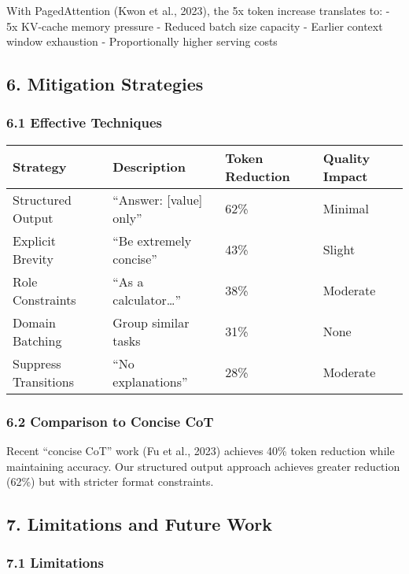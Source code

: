 \documentclass[
  11pt]{article}
\begin{document}
With PagedAttention (Kwon et al., 2023), the 5x token increase
translates to: - 5x KV-cache memory pressure - Reduced batch size
capacity - Earlier context window exhaustion - Proportionally higher
serving costs

\subsection{6. Mitigation Strategies}\label{mitigation-strategies}

\subsubsection{6.1 Effective Techniques}\label{effective-techniques}

\begin{longtable}[]{@{}llll@{}}
\toprule\noalign{}
Strategy & Description & Token Reduction & Quality Impact \\
\midrule\noalign{}
\endhead
\bottomrule\noalign{}
\endlastfoot
Structured Output & ``Answer: {[}value{]} only'' & 62\% & Minimal \\
Explicit Brevity & ``Be extremely concise'' & 43\% & Slight \\
Role Constraints & ``As a calculator\ldots{}'' & 38\% & Moderate \\
Domain Batching & Group similar tasks & 31\% & None \\
Suppress Transitions & ``No explanations'' & 28\% & Moderate \\
\end{longtable}

\subsubsection{6.2 Comparison to Concise
CoT}\label{comparison-to-concise-cot}

Recent ``concise CoT'' work (Fu et al., 2023) achieves 40\% token
reduction while maintaining accuracy. Our structured output approach
achieves greater reduction (62\%) but with stricter format constraints.

\subsection{7. Limitations and Future
Work}\label{limitations-and-future-work}

\subsubsection{7.1 Limitations}\label{limitations}
\end{document}
